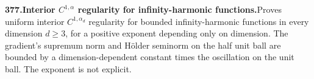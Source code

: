 \documentclass[11pt,a4paper]{article}
\begin{document}
  \par \begin{minipage}{\linewidth}
  \fontsize{10.5}{12.6}\selectfont\RaggedRight
  \hypertarget{result 377}{}
  {\bfseries\textcolor{muted}{377.}\enspace Interior $C^{1,\alpha}$ regularity for infinity-harmonic functions.}\enspace Proves uniform interior $C^{1,\alpha_d}$ regularity for bounded infinity-harmonic functions in every dimension $d\ge3$, for a positive exponent depending only on dimension. The gradient's supremum norm and H\"older seminorm on the half unit ball are bounded by a dimension-dependent constant times the oscillation on the unit ball. The exponent is not explicit.\par
  \end{minipage}\par\vspace{5pt}
\end{document}
